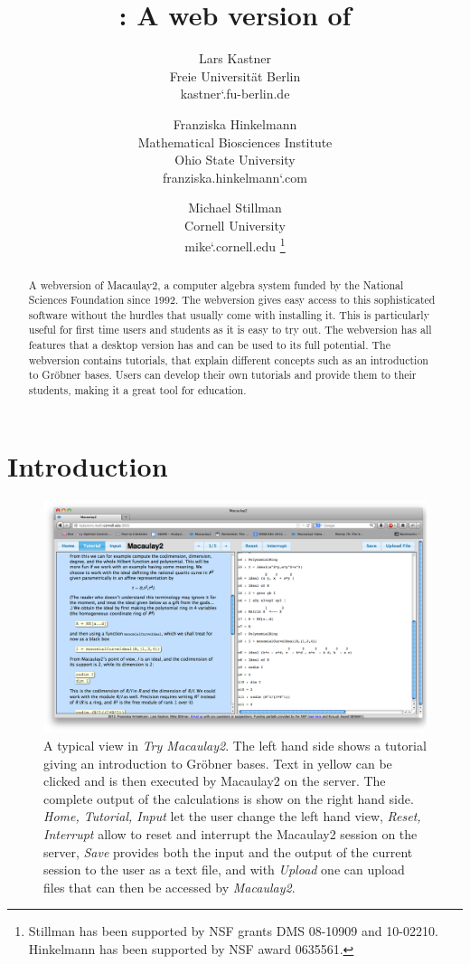 \documentclass[]{article}
\title{\tryM2: A web version of \M2}
\author{Lars Kastner\\ Freie Universit\"at Berlin \\{\small kastner\char`\@math.fu-berlin.de} \and 
Franziska Hinkelmann\\Mathematical Biosciences Institute\\ Ohio State University \\{\small franziska.hinkelmann\char`\@gmail.com} \and 
Michael Stillman\\Cornell University \\{\small mike\char`\@math.cornell.edu} \thanks{Stillman has been supported by NSF grants DMS 08-10909 and 10-02210. Hinkelmann has been supported by NSF award 0635561.} }
\date{}
\def\tryM2{{\it Try Macaulay2}}
\def\M2{{\it Macaulay2}}
\begin{document}
\ifpdf
{}
\else
{}
\fi



\maketitle



\begin{abstract}

    A webversion of Macaulay2, a computer algebra system funded by the
    National Sciences Foundation since 1992. The webversion gives easy
    access to this sophisticated software without the hurdles that
    usually come with installing it. This is particularly useful for
    first time users and students as it is easy to try out. The
    webversion has all features that a desktop version has and can be
    used to its full potential. The webversion contains tutorials,
    that explain different concepts such as an introduction to
    Gr\"obner bases. Users can develop their own tutorials and provide
    them to their students, making it a great tool for education.

\end{abstract}


\section{Introduction}
\begin{figure}[htb]
    \includegraphics[width=.95\textwidth]{homeWebsite.jpg}
    \caption{A typical view in \tryM2. The left hand
      side shows a tutorial giving an introduction to Gr\"obner
      bases. Text in yellow can be clicked and is then executed by
      Macaulay2 on the server. The complete output of the calculations
      is show on the right hand side. {\it Home, Tutorial, Input} let
      the user change the left hand view, {\it Reset, Interrupt} allow
      to reset and interrupt the Macaulay2 session on the server, {\it
        Save} provides both the input and the output of the current
      session to the user as a text file, and with {\it Upload} one
      can upload files that can then be accessed by \M2.}
    \label{fig:home}
\end{figure}
\end{document}

